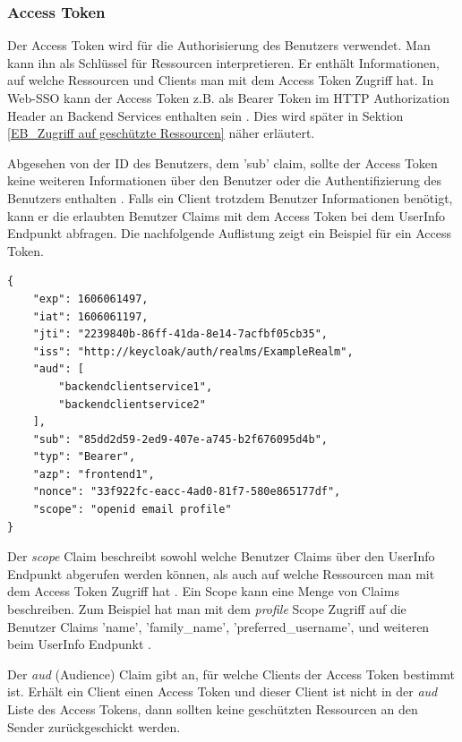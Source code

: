 \subsubsection{Access Token} \label{EB_AccessToken}

Der Access Token wird für die Authorisierung des Benutzers verwendet. Man kann ihn als Schlüssel für Ressourcen interpretieren. Er enthält Informationen, auf welche Ressourcen und Clients man mit dem Access Token Zugriff hat. In Web-SSO kann der Access Token z.B. als Bearer Token im HTTP Authorization Header an Backend Services enthalten sein \cite{EB27}. Dies wird später in Sektion \ref{EB_Zugriff auf geschützte Ressourcen} näher erläutert.

Abgesehen von der ID des Benutzers, dem 'sub' claim, sollte der Access Token keine weiteren Informationen über den Benutzer oder die Authentifizierung des Benutzers enthalten \cite{EB7}. Falls ein Client trotzdem Benutzer Informationen benötigt, kann er die erlaubten Benutzer Claims mit dem Access Token bei dem UserInfo Endpunkt abfragen. Die nachfolgende Auflistung zeigt ein Beispiel für ein Access Token.

\begin{lstlisting}[caption=Beispiel Access Token, captionpos=b]
{
	"exp": 1606061497,
	"iat": 1606061197,
	"jti": "2239840b-86ff-41da-8e14-7acfbf05cb35",
	"iss": "http://keycloak/auth/realms/ExampleRealm",
	"aud": [
		"backendclientservice1",
		"backendclientservice2"
	],
	"sub": "85dd2d59-2ed9-407e-a745-b2f676095d4b",
	"typ": "Bearer",
	"azp": "frontend1",
	"nonce": "33f922fc-eacc-4ad0-81f7-580e865177df",
	"scope": "openid email profile"
}
\end{lstlisting}

Der \textit{scope} Claim beschreibt sowohl welche Benutzer Claims über den UserInfo Endpunkt abgerufen werden können, als auch auf welche Ressourcen man mit dem Access Token Zugriff hat \cite{EB11} \cite{EB7}. Ein Scope kann eine Menge von Claims beschreiben. Zum Beispiel hat man mit dem \textit{profile} Scope Zugriff auf die Benutzer Claims 'name', 'family\_name', 'preferred\_username', und weiteren beim UserInfo Endpunkt \cite{EB11}. 

Der \textit{aud} (Audience) Claim gibt an, für welche Clients der Access Token bestimmt ist. Erhält ein Client einen Access Token und dieser Client ist nicht in der \textit{aud} Liste des Access Tokens, dann sollten keine geschützten Ressourcen an den Sender zurückgeschickt werden.



